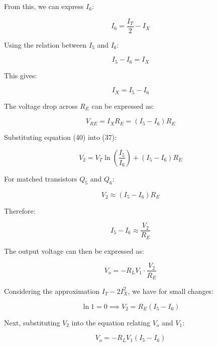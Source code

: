 \documentclass[a4paper,9pt,twoside,openany,twocolumn]{memoir}
\begin{document}
From this, we can express \( I_6 \):

\begin{equation}
I_6 = \frac{I_T}{2} - I_X \tag{8}
\end{equation}

Using the relation between \( I_5 \) and \( I_6 \):

\begin{equation}
I_5 - I_6 = I_X \tag{9}
\end{equation}

This gives:

\begin{equation}
I_X = I_5 - I_6 \tag{10}
\end{equation}

The voltage drop across \( R_E \) can be expressed as:

\begin{equation}
V_{RE} = I_X R_E = (I_5 - I_6) R_E \tag{40}
\end{equation}

Substituting equation (40) into (37):

\begin{equation}
V_2 = V_T \ln \left( \frac{I_5}{I_6} \right) + (I_5 - I_6) R_E \tag{41}
\end{equation}

For matched transistors \( Q_5 \) and \( Q_6 \):

\begin{equation}
V_2 \approx (I_5 - I_6) R_E \tag{42}
\end{equation}

Therefore:

\begin{equation}
I_5 - I_6 \approx \frac{V_2}{R_E} \tag{43}
\end{equation}

The output voltage can then be expressed as:

\begin{equation}
V_o = -R_L V_1 \cdot \frac{V_2}{R_E} \tag{44}
\end{equation}

Considering the approximation \( I_T - 2I_X^2 \), we have for small changes:

\[
\ln 1 = 0 \implies V_2 = R_E (I_5 - I_6) \tag{15}
\]

Next, substituting \( V_2 \) into the equation relating \( V_o \) and \( V_1 \):

\begin{equation}
V_o = -R_L V_1 (I_5 - I_6) \tag{16}
\end{equation}
\end{document}
